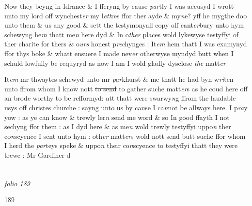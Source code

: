 \documentclass[12pt, a4paper]{book}
\begin{document}
		\ifthenelse{\isodd{\thepage}}
		{\reversemarginpar}
		{\normalmarginpar}
		Now they beyng in Idrance \& I fferyng by cause \textit{par}tly I was
			 accusyd I wrott unto my lord off wynchest\textit{er} my l\textit{ett}res ffor ther ayde \& my\textit{n}e?
			 yff he mygthe doo unto them \& us
			 any good \& sett the testymonyall copy off cant\textit{er}bury unto hym schewyng he\textit{m} thatt me\textit{n} here dyd \& In o\textit{ther} places wold lykewyse testyffyi of ther charite
			 for thers \& o\textit{urs} honest p\textit{re}chynges : It\textit{em} hem thatt I was examynyd ffor thys boke \& whatt ensuere I made nev\textit{er} otherwyse myndyd butt when I schuld lowfully be requyryd as now I am I wold gladly dysclose \textit{the} matt\textit{er}
      					
		\ifthenelse{\isodd{\thepage}}
		{\reversemarginpar}
		{\normalmarginpar}
		It\textit{em} mr thwaytes schewyd unto mr \textit{par}khurst \& me thatt he had byn w\textit{ri}ten unto ffrom whom I know nott \sout{to send }to gather suche matt\textit{er}s as he coud here off an brode worthy to be refformyd: att thatt were swarwy\textit{n}g ffrom the laudable usys off christes churche : sayng unto us by cause I ca\textit{n}not be allways here. I p\textit{ra}y yow : as ye can know \& trewly ler\textit{n} send me word \& so In good ffayth I not sechyng ffor them : as I dyd here \& as me\textit{n} wold trewly testyffyi uppo\textit{n} ther co\textit{n}scyence I sent unto hym : oth\textit{er} matt\textit{er}s wold nott send butt suche ffor whom I herd the \textit{par}teys speke \& uppo\textit{n} their co\textit{n}scyence to testyffyi thatt they were trewe : \textit{ }Mr Gardiner d
      				
\dotfill
						\newpage {} \section*{}

\textit{folio 189}
      				
      				
      				
      				\begin{flushright}{\color{Mahogany}189}\end{flushright}
      				
\end{document}
